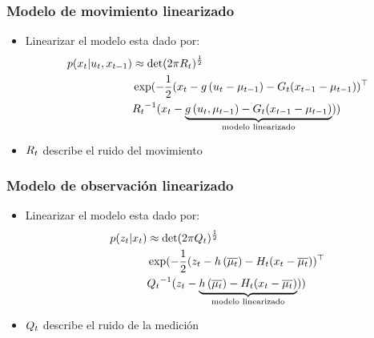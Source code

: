 \begin{frame}
    \frametitle{Modelo de movimiento linearizado}
    
    \begin{itemize}
        \item Linearizar el modelo esta dado por:
    \begin{align*}
        p(x_{t} | u_{t}, x_{t-1}) &\approx \det(2 \pi R_{t})^{\frac{1}{2}}\\
        &\exp (-\dfrac{1}{2} (x_{t} - g\left( u_{t}-\mu_{t-1} \right) - G_{t}(x_{t-1}-\mu_{t-1}))^{\top}\\
        &{R_{t}}^{-1} (x_{t} - \underbrace{g\left( u_{t},\mu_{t-1} \right) - G_{t} (x_{t-1}-\mu_{t-1})}_{\text{modelo linearizado}}))
    \end{align*}
    
    \item $R_{t}$ describe el ruido del movimiento
    \end{itemize}    
\end{frame}

\begin{frame}
    \frametitle{Modelo de observación linearizado}
    
    \begin{itemize}
        \item Linearizar el modelo esta dado por:
        \begin{align*}
            p(z_{t} | x_{t}) &\approx \det(2 \pi Q_{t})^{\frac{1}{2}}\\
            &\exp (-\dfrac{1}{2} (z_{t} - h\left( \overline{\mu_{t}} \right) - H_{t}(x_{t} - \overline{\mu_{t}}))^{\top}\\
            &{Q_{t}}^{-1} (z_{t} - \underbrace{h\left( \overline{\mu_{t}} \right) - H_{t} (x_{t}-\overline{\mu_{t}})}_{\text{modelo linearizado}}))
        \end{align*}
        
        \item $Q_{t}$ describe el ruido de la medición
    \end{itemize}    
    
    
\end{frame}


